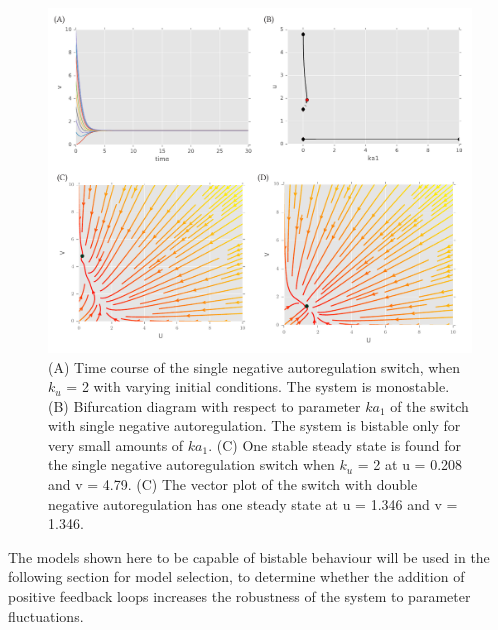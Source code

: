 \begin{figure}[htbp]
\centerfloat
\includegraphics[scale=0.7]{../../chapters/chapterABCSysBio/images/gard_neg.pdf}
\caption[Phase plane and bifurcation analysis of the switch with negative autoregulation]{\label{fig:Gard_neg}(A) Time course of the single negative autoregulation switch, when $k_u$ = 2 with varying initial conditions. The system is monostable. (B) Bifurcation diagram with respect to parameter $ka_1$ of the switch with single negative autoregulation. The system is bistable only for very small amounts of $ka_1$. (C) One stable steady state is found for the single negative autoregulation switch when $k_u$ = 2 at u = 0.208 and v = 4.79. (C) The vector plot of the switch with double negative autoregulation has one steady state at u = 1.346 and v = 1.346.}

\end{figure}
\clearpage

The models shown here to be capable of bistable behaviour will be used in the following section for model selection, to determine whether the addition of positive feedback loops increases the robustness of the system to parameter fluctuations.




